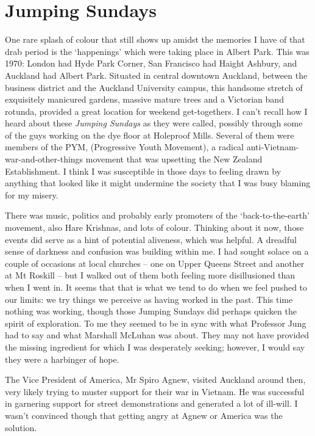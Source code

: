 \chapter{Jumping Sundays}

One rare splash of colour that still shows up amidst the memories I have
of that drab period is the `happenings' which were taking place in
Albert Park. This was 1970: London had Hyde Park Corner, San Francisco
had Haight Ashbury, and Auckland had Albert Park. Situated in central
downtown Auckland, between the business district and the Auckland
University campus, this handsome stretch of exquisitely manicured
gardens, massive mature trees and a Victorian band rotunda, provided a
great location for weekend get-togethers. I can't recall how I heard
about these \emph{Jumping Sundays} as they were called, possibly through
some of the guys working on the dye floor at Holeproof Mills. Several of
them were members of the PYM, (Progressive Youth Movement)\cite{pym}, a radical
anti-Vietnam-war-and-other-things movement that was upsetting the New
Zealand Establishment. I think I was susceptible in those days to
feeling drawn by anything that looked like it might undermine the
society that I was busy blaming for my misery.

There was music, politics and probably early promoters of the
`back-to-the-earth' movement, also Hare Krishnas, and lots of
colour. Thinking about it now, those events did serve as a hint of
potential aliveness, which was helpful. A dreadful sense of darkness and
confusion was building within me. I had sought solace on a couple of
occasions at local churches -- one on Upper Queens Street and another
at Mt Roskill -- but I walked out of them both feeling more
disillusioned than when I went in. It seems that that is what we tend to
do when we feel pushed to our limits: we try things we perceive as
having worked in the past. This time nothing was working, though those
Jumping Sundays did perhaps quicken the spirit of exploration. To me
they seemed to be in sync with what Professor Jung had to say and what
Marshall McLuhan was about. They may not have provided the missing
ingredient for which I was desperately seeking; however, I would say
they were a harbinger of hope.

The Vice President of America, Mr Spiro Agnew, visited Auckland around
then, very likely trying to muster support for their war in Vietnam. He
was successful in garnering support for street demonstrations and
generated a lot of ill-will. I wasn't convinced though that getting
angry at Agnew or America was the solution.

